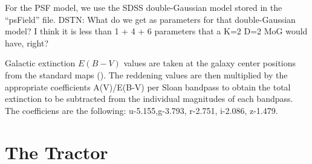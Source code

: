 \documentclass[12pt,preprint,pdftex]{aastex}
\begin{document}
For the PSF model, we use the SDSS double-Gaussian model stored in the
``psField'' file.  DSTN: What do we get as parameters for that
double-Gaussian model?  I think it is less than 1 + 4 + 6 parameters
that a K=2 D=2 MoG would have, right?

Galactic extinction $E(B-V)$ values are taken at the galaxy center
positions from the standard maps (\citealt{schlegel98}).  The
reddening values are then multiplied by the appropriate coefficients
A(V)/E(B-V) per Sloan bandpass to obtain the total extinction to be
subtracted from the individual magnitudes of each bandpass. The
coefficiens are the following: u-5.155,g-3.793, r-2.751, i-2.086,
z-1.479.


\section{The Tractor}
\end{document}
